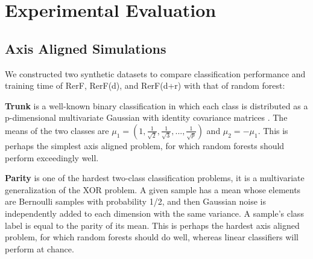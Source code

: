 \documentclass{article} %
\begin{document}

\section{Experimental Evaluation}

\subsection{Axis Aligned Simulations}

We constructed two synthetic datasets to compare classification performance and training time of RerF, RerF(d), and RerF(d+r) with that of random forest:

\textbf{Trunk} is a well-known binary classification in which each class is distributed as a p-dimensional multivariate Gaussian with identity covariance matrices \cite{Trunk1979}. The means of the two classes are $\mu_1 = (1,\frac{1}{\sqrt{2}},\frac{1}{\sqrt{3}},...,\frac{1}{\sqrt{p}})$ and $\mu_2 = -\mu_1$. This is perhaps the simplest axis aligned problem, for which random forests should perform exceedingly well.  

\textbf{Parity} is one of the hardest two-class classification problems, it is a multivariate generalization of the XOR problem.  A given sample has a mean whose elements are Bernoulli samples with probability 1/2, and then Gaussian noise is independently added to each dimension with the same variance.  A sample's class label is equal to the parity of its mean.  This is perhaps the hardest axis aligned problem, for which random forests should do well, whereas linear classifiers will perform at chance.

\end{document}
